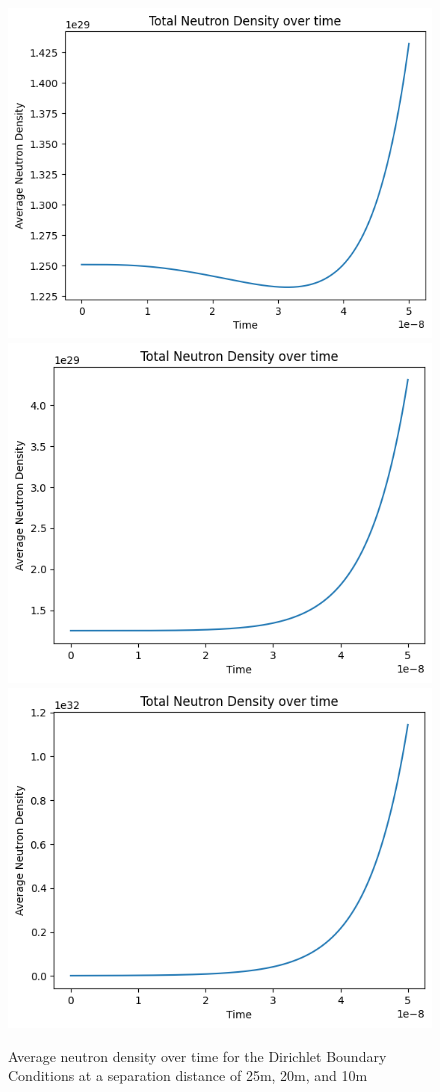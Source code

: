 \documentclass[letterpaper, 12pt]{article}
\begin{document}
         \begin{figure}[t]
            \centering
            \includegraphics[width=0.32\linewidth]{Graphs/DirichletCubes_Density_Vs_Time_Far.png}
            \includegraphics[width=0.32\linewidth]{Graphs/DirichletCubes_Density_Vs_Time_Middle.png}
            \includegraphics[width=0.32\linewidth]{Graphs/DirichletCubes_Density_Vs_Time_Close.png}
            \caption{Average neutron density over time for the Dirichlet Boundary Conditions at a separation distance of 25m, 20m, and 10m}
            \label{img:Dirichlet_Cubes}
         \end{figure}
\end{document}
